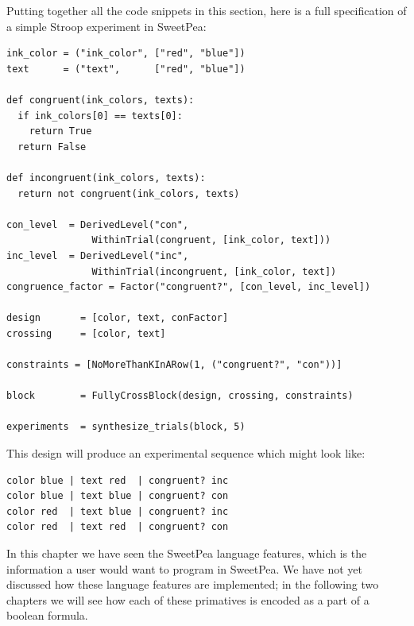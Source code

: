 Putting together all the code snippets in this section, here is a full specification of a simple Stroop experiment in SweetPea:

\begin{verbatim}
ink_color = ("ink_color", ["red", "blue"])
text      = ("text",      ["red", "blue"])

def congruent(ink_colors, texts):
  if ink_colors[0] == texts[0]:
    return True
  return False

def incongruent(ink_colors, texts):
  return not congruent(ink_colors, texts)

con_level  = DerivedLevel("con",
               WithinTrial(congruent, [ink_color, text]))
inc_level  = DerivedLevel("inc",
               WithinTrial(incongruent, [ink_color, text])
congruence_factor = Factor("congruent?", [con_level, inc_level])

design       = [color, text, conFactor]
crossing     = [color, text]

constraints = [NoMoreThanKInARow(1, ("congruent?", "con"))]

block        = FullyCrossBlock(design, crossing, constraints)

experiments  = synthesize_trials(block, 5)
\end{verbatim}

This design will produce an experimental sequence which might look like:

\begin{verbatim}
color blue | text red  | congruent? inc
color blue | text blue | congruent? con
color red  | text blue | congruent? inc
color red  | text red  | congruent? con
\end{verbatim}


In this chapter we have seen the SweetPea language features, which is the information a user would want to program in SweetPea. We have not yet discussed how these language features are implemented; in the following two chapters we will see how each of these primatives is encoded as a part of a boolean formula.
